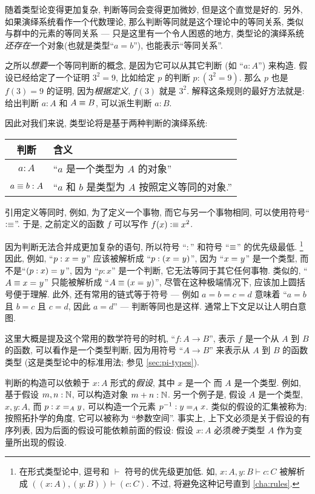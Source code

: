 随着类型论变得更加复杂, 判断等同会变得更加微妙, 但是这个直觉是好的.
另外, 如果演绎系统看作一个代数理论, 那么判断等同就是这个理论中的等同关系, 类似与群中的元素的等同关系 --- 只是这里有一个令人困惑的地方, 类型论的演绎系统\emph{还}\emph{存在}一个对象(也就是类型``$a=b$''), 也能表示``等同关系''.

之所以\emph{想要}一个等同判断的概念, 是因为它可以从其它判断 (如 ``$a:A$'') 来构造.
假设已经给定了一个证明 $3^2=9$, 比如给定 $p$ 的判断 $p:(3^2=9)$.
那么 $p$ 也是 $f(3)=9$ 的证明, 因为\emph{根据定义}, $f(3)$ 就是 $3^2$.
解释这条规则的最好方法就是: 给出判断 $a:A$ 和 $A\jdeq B$, 可以派生判断 $a:B$.

因此对我们来说, 类型论将是基于两种判断的演绎系统:
\begin{center}
    \medskip
    \begin{tabular}{cl}
        \toprule
        判断              & 含义                                \\
        \midrule
        $a : A$         & ``$a$ 是一个类型为 $A$  的对象''             \\
        $a \jdeq b : A$ & ``$a$ 和 $b$ 是类型为 $A$ 按照定义等同的对象.'' \\
        \bottomrule
    \end{tabular}
    \medskip
\end{center}%
%
引用定义等同时, 例如, 为了定义一个事物, 而它与另一个事物相同, 可以使用符号``$\defeq$''.
于是, 之前定义的函数 $f$ 可以写作 $f(x)\defeq x^2$.

因为判断无法合并成更加复杂的语句, 所以符号 ``$:$'' 和符号 ``$\jdeq$'' 的优先级最低.
\footnote{在形式类型论中, 逗号和 $\vdash$ 符号的优先级更加低.
如, $x:A,y:B\vdash c:C$ 被解析成 $((x:A),(y:B))\vdash (c:C)$.
不过, 将避免这种记号直到 \cref{cha:rules}.}
因此, 例如, ``$p:\id{x}{y}$'' 应该被解析成 ``$p:(\id{x}{y})$'', 因为 ``$\id{x}{y}$'' 是一个类型, 而不是``$\id{(p:x)}{y}$'', 因为 ``$p:x$'' 是一个判断, 它无法等同于其它任何事物.
类似的, ``$A\jdeq \id{x}{y}$'' 只能被解析成 ``$A\jdeq(\id{x}{y})$'',  尽管在这种极端情况下, 应该加上圆括号便于理解.
此外, 还有常用的链式等于符号 --- 例如 $a=b=c=d$ 意味着 ``$a=b$ 且 $b=c$ 且 $c=d$, 因此 $a=d$'' --- 判断等同也是这样.
通常上下文足以让人明白意图.

这里大概是提及这个常用的数学符号的时机, ``$f:A\to B$'', 表示 $f$ 是一个从  $A$ 到 $B$ 的函数, 可以看作是一个类型判断, 因为用符号 ``$A\to B$'' 来表示从  $A$ 到 $B$ 的函数类型
(这是类型论中的标准用法;
参见 \cref{sec:pi-types}).

%
判断的构造可以依赖于 $x:A$ 形式的\emph{假设}, 其中 $x$ 是一个 %
而 $A$ 是一个类型.
例如, 基于假设 $m,n : \nat$, 可以构造对象 $m + n : \nat$.
另一个例子是, 假设 $A$ 是一个类型, $x,y : A$, 而  $p : \id[A]{x}{y}$, 可以构造一个元素 $p^{-1} : \id[A]{y}{x}$.
类似的假设的汇集被称为;
按照拓扑学的角度, 它可以被称为 ``参数空间''.
事实上, 上下文必须是关于假设的有序列表, 因为后面的假设可能依赖前面的假设: 假设 $x:A$ 必须\emph{晚于}类型 $A$ 作为变量所出现的假设.

